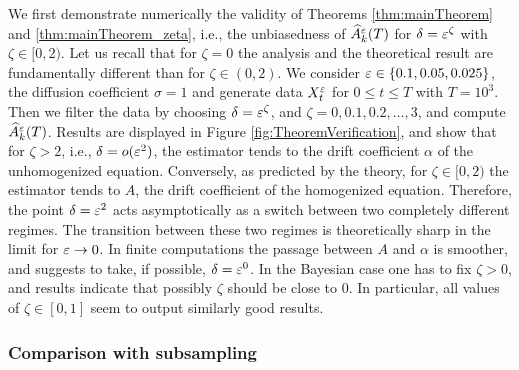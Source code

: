 \documentclass[10pt]{article}
\begin{document}
We first demonstrate numerically the validity of Theorems \ref{thm:mainTheorem} and \ref{thm:mainTheorem_zeta}, i.e., the unbiasedness of $\widehat A^\varepsilon_k(T)$ for $\delta = \varepsilon^\zeta$ with $\zeta \in [0, 2)$. Let us recall that for $\zeta = 0$ the analysis and the theoretical result are fundamentally different than for $\zeta \in (0, 2)$. We consider $\varepsilon \in \{0.1, 0.05, 0.025\}$, the diffusion coefficient $\sigma = 1$ and generate data $X^\varepsilon_t$ for $0 \leq t \leq T$ with $T = 10^3$. Then we filter the data by choosing $\delta = \varepsilon^\zeta$, and $\zeta = 0, 0.1, 0.2,\ldots, 3$, and compute $\widehat A^\varepsilon_k(T)$. Results are displayed in Figure \ref{fig:TheoremVerification}, and show that for $\zeta > 2$, i.e., $\delta = o(\varepsilon^2)$, the estimator tends to the drift coefficient $\alpha$ of the unhomogenized equation. Conversely, as predicted by the theory, for $\zeta \in [0, 2)$ the estimator tends to $A$, the drift coefficient of the homogenized equation. Therefore, the point $\delta = \varepsilon^2$ acts asymptotically as a switch between two completely different regimes. The transition between these two regimes is theoretically sharp in the limit for $\varepsilon \to 0$. In finite computations the passage between $A$ and $\alpha$ is smoother, and suggests to take, if possible, $\delta = \varepsilon^0$. In the Bayesian case one has to fix $\zeta > 0$, and results indicate that possibly $\zeta$ should be close to $0$. In particular, all values of $\zeta \in [0, 1]$ seem to output similarly good results.


\subsubsection{Comparison with subsampling}\label{sec:Num_Param2}
\end{document}
